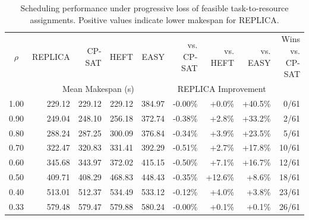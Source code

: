 \begin{table}[!t]
\centering
\caption{Scheduling performance under progressive loss of feasible task-to-resource assignments. Positive values indicate lower makespan for REPLICA.}
\label{tab:exp2-scheduling}
\footnotesize
\setlength{\tabcolsep}{3.5pt}
\begin{tabular}{c r r r r r r r r}
\hline
$\rho$ & REPLICA & CP-SAT & HEFT & EASY & vs. CP-SAT & vs. HEFT & vs. EASY & Wins vs. CP-SAT \\
 & \multicolumn{4}{c}{Mean Makespan (s)} & \multicolumn{3}{c}{REPLICA Improvement} & \\
\hline
1.00 & 229.12 & 229.12 & 229.12 & 384.97 & -0.00\% & +0.0\% & +40.5\% & 0/61 \\
0.90 & 249.04 & 248.10 & 256.18 & 372.74 & -0.38\% & +2.8\% & +33.2\% & 2/61 \\
0.80 & 288.24 & 287.25 & 300.09 & 376.84 & -0.34\% & +3.9\% & +23.5\% & 5/61 \\
0.70 & 322.47 & 320.83 & 331.41 & 392.29 & -0.51\% & +2.7\% & +17.8\% & 10/61 \\
0.60 & 345.68 & 343.97 & 372.02 & 415.15 & -0.50\% & +7.1\% & +16.7\% & 12/61 \\
0.50 & 409.71 & 408.29 & 468.83 & 448.43 & -0.35\% & +12.6\% & +8.6\% & 18/61 \\
0.40 & 513.01 & 512.37 & 534.49 & 533.12 & -0.12\% & +4.0\% & +3.8\% & 23/61 \\
0.33 & 579.48 & 579.47 & 579.88 & 580.24 & -0.00\% & +0.1\% & +0.1\% & 26/61 \\
\hline
\end{tabular}
\end{table}